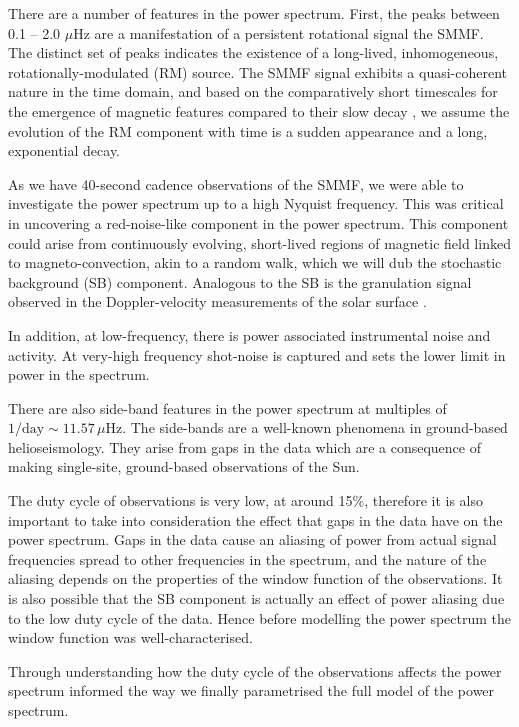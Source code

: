 There are a number of features in the power spectrum. First, the peaks between 0.1 -- 2.0 $\mu\mathrm{Hz}$ are a manifestation of a persistent rotational signal the SMMF. The distinct set of peaks indicates the existence of a long-lived, inhomogeneous, rotationally-modulated (RM) source. The SMMF signal exhibits a quasi-coherent nature in the time domain, and based on the comparatively short timescales for the emergence of magnetic features compared to their slow decay \citep{zwaan_solar_1981, harvey_properties_1993, hathaway_sunspot_2008}, we assume the evolution of the RM component with time is a sudden appearance and a long, exponential decay.

As we have 40-second cadence observations of the SMMF, we were able to investigate the power spectrum up to a high Nyquist frequency. This was critical in uncovering a red-noise-like component in the power spectrum. This component could arise from continuously evolving, short-lived regions of magnetic field linked to magneto-convection, akin to a random walk, which we will dub the stochastic background (SB) component. Analogous to the SB is the granulation signal observed in the Doppler-velocity measurements of the solar surface \citep{basu_asteroseismic_2017}. 

In addition, at low-frequency, there is power associated instrumental noise and activity. At very-high frequency shot-noise is captured and sets the lower limit in power in the spectrum. 

There are also side-band features in the power spectrum at multiples of $1/\mathrm{day} \sim 11.57 \, \mu\mathrm{Hz}$. The side-bands are a well-known phenomena in ground-based helioseismology. They arise from gaps in the data which are a consequence of making single-site, ground-based observations of the Sun.

The duty cycle of observations is very low, at around 15\%, therefore it is also important to take into consideration the effect that gaps in the data have on the power spectrum. Gaps in the data cause an aliasing of power from actual signal frequencies spread to other frequencies in the spectrum, and the nature of the aliasing depends on the properties of the window function of the observations. It is also possible that the SB component is actually an effect of power aliasing due to the low duty cycle of the data. Hence before modelling the power spectrum the window function was well-characterised.

Through understanding how the duty cycle of the observations affects the power spectrum informed the way we finally parametrised the full model of the power spectrum.


